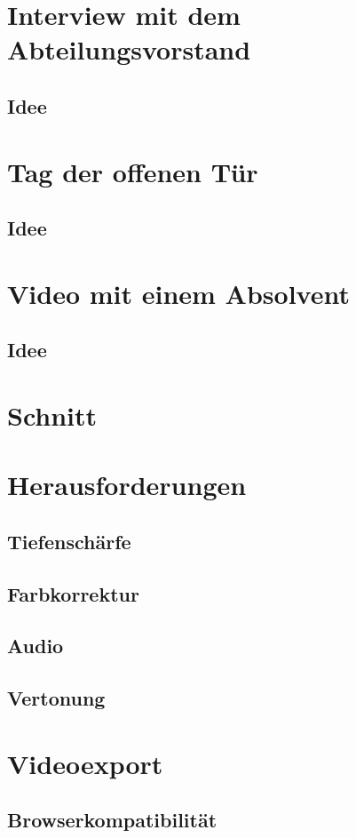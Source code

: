 \section{Interview mit dem Abteilungsvorstand}
\subsection{Idee}
\section{Tag der offenen Tür}
\subsection{Idee}
\section{Video mit einem Absolvent}
\subsection{Idee}

\section{Schnitt}

\section{Herausforderungen}
\subsection{Tiefenschärfe}
\subsection{Farbkorrektur}
\subsection{Audio}
\subsection{Vertonung}

\section{Videoexport}
\subsection{Browserkompatibilität}
